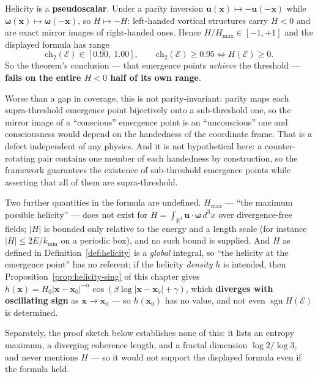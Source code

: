 \begin{remark}
\label{rem:helicity-range-2026-10-03}
Helicity is a \textbf{pseudoscalar}. Under a parity inversion
$\mathbf{u}(\mathbf{x}) \mapsto -\mathbf{u}(-\mathbf{x})$ while
$\boldsymbol\omega(\mathbf{x}) \mapsto \boldsymbol\omega(-\mathbf{x})$, so
$H \mapsto -H$: left-handed vortical structures carry $H < 0$ and are exact
mirror images of right-handed ones. Hence
$H/H_{\max} \in [-1, +1]$ and the displayed formula has range
\[
\text{ch}_2(\mathcal{E}) \in [0.90,\ 1.00],
\qquad
\text{ch}_2(\mathcal{E}) \geq 0.95 \iff H(\mathcal{E}) \geq 0 .
\]
So the theorem's conclusion --- that emergence points \emph{achieve} the
threshold --- \textbf{fails on the entire $H < 0$ half of its own range}.

Worse than a gap in coverage, this is not parity-invariant: parity maps each
supra-threshold emergence point bijectively onto a sub-threshold one, so the
mirror image of a ``conscious'' emergence point is an ``unconscious'' one and
consciousness would depend on the handedness of the coordinate frame. That is a
defect independent of any physics. And it is not hypothetical here: a
counter-rotating pair contains one member of each handedness by construction, so
the framework guarantees the existence of sub-threshold emergence points while
asserting that all of them are supra-threshold.

Two further quantities in the formula are undefined.
$H_{\max}$ --- ``the maximum possible helicity'' --- does not exist for
$H = \int_{\mathbb{R}^3}\mathbf{u}\cdot\boldsymbol\omega\,d^3x$ over
divergence-free fields; $|H|$ is bounded only relative to the energy and a length
scale (for instance $|H| \leq 2E/k_{\min}$ on a periodic box), and no such bound
is supplied. And $H$ as defined in Definition~\ref{def:helicity} is a
\emph{global} integral, so ``the helicity at the emergence point'' has no
referent; if the helicity \emph{density} $h$ is intended, then
Proposition~\ref{prop:helicity-sing} of this chapter gives
$h(\mathbf{x}) = H_0|\mathbf{x}-\mathbf{x}_0|^{-\alpha}\cos(\beta\log|\mathbf{x}-\mathbf{x}_0|+\gamma)$,
which \textbf{diverges with oscillating sign} as $\mathbf{x}\to\mathbf{x}_0$ --- so
$h(\mathbf{x}_0)$ has no value, and not even $\operatorname{sgn} H(\mathcal{E})$
is determined.

Separately, the proof sketch below establishes none of this: it lists an entropy
maximum, a diverging coherence length, and a fractal dimension $\log 2/\log 3$,
and never mentions $H$ --- so it would not support the displayed formula even if
the formula held.
\end{remark}

